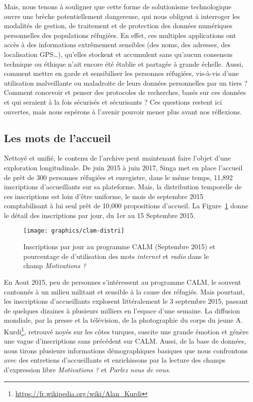 \documentclass[symmetric,justified,marginals=raggedouter]{tufte-book}
\begin{document}
Mais, nous tenons à souligner que cette forme de solutionisme technologique \citep{morozov_save_2013} ouvre une brèche potentiellement dange\-reuse, qui nous obligent à interroger les modalités de gestion, de traitement et de protection des données numériques personnelles des populations réfugiées. En effet, ces multiples applications ont accès à des informations extrêmement sensibles (des noms, des adresses, des localisation GPS\ldots{}), qu'elles stockent et accumulent sans qu'aucun consensus technique ou éthique n'ait encore été établie et partagée à grande échelle. Aussi, comment mettre en garde et sensibiliser les personnes réfugiées, vis-à-vis d'une utilisation malveillante ou maladroite de leurs données personnelles par un tiers ? Comment concevoir et penser des protocoles de recherches, basés sur ces données et qui seraient à la fois sécurisés et sécurisants ? Ces questions restent ici ouvertes, mais nous espérons à l'avenir pouvoir mener plus avant nos réflexions.

\subsection{Les mots de l'accueil}

\noindent Nettoyé et unifié, le contenu de l'archive peut maintenant faire l'objet d'une exploration longitudinale. De juin 2015 à juin 2017, Singa met en place l'accueil de prêt de 300 personnes réfugiées et enregistre, dans le même temps, 11,892 inscriptions d'accueillants sur sa plateforme. Mais, la distribution temporelle de ces inscriptions est loin d'être uniforme, le mois de septembre 2015 comptabilisant à lui seul prêt de 10,000 propositions d'accueil. La Figure~\ref{fig:calm-distri} donne le détail des inscriptions par jour, du 1er au 15 Septembre 2015.

\begin{figure}
  \texttt{[image: graphics/clam-distri]}
  \caption{Inscriptions par jour au programme CALM (Septembre 2015) et pourcentage de d'utilisation des mots \textit{internet} et \textit{radio} dans le champ \textit{Motivations ?}}
  \label{fig:calm-distri}
\end{figure}

\noindent En Aout 2015, peu de personnes s'intéressent au programme CALM, le souvent cantonnés à un milieu militant et sensible à la cause des réfugiés. Mais pourtant, les inscriptions d'accueillants explosent littéralement le 3 septembre 2015, passant de quelques dizaines à plusieurs milliers en l'espace d'une semaine. La diffusion mondiale, par la presse et la télévision, de la photographie du corps du jeune A. Kurdi\footnote{\RaggedOuter \url{https://fr.wikipedia.org/wiki/Alan_Kurdi}}, retrouvé noyés sur les côtes turques, suscite une grande émotion et génère une vague d'inscriptions sans précédent sur CALM. Aussi, de la base de données, nous tirons plusieurs informations démographiques basiques que nous confrontons avec des entretiens d'accueillants et enrichissons par la lecture des champs d'expression libre \textit{Motivations ?} et \textit{Parlez nous de vous}. 
\end{document}
